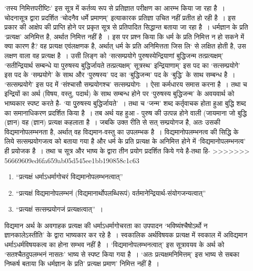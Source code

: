 ‘तस्य निमित्तपरीष्टिः' इस सूत्र में कर्तव्य रूप से प्रतिज्ञात परीक्षण का आरम्भ किया जा रहा है~। चोदनासूत्र द्वारा प्रदर्शित ‘चोदनैव धर्मे प्रमाणम्' इत्याकारक प्रतिज्ञा उचित नहीं प्रतीत हो रही है~। इस प्रकार की आक्षेप की प्राप्ति होने पर प्रकृत सूत्र से प्रतिपादित सिद्धान्त बताया जा रहा है~। धर्मज्ञान के प्रति ‘प्रत्यक्ष' अनिमित्त है, अर्थात निमित्त नहीं है~। इस पर प्रश्न किया कि धर्म के प्रति निमित्त न हो सकने में क्या कारण है? वह प्रत्यक्ष एवंलक्षणक है, अर्थात् धर्म के प्रति अनिमित्तता जिस लि‘ से लक्षित होती है, उस लक्षण वाला वह प्रत्यक्ष है~। उसी लिङ्ग को ‘सत्सम्प्रयोगे पुरुषस्येन्द्रियाणां बुद्धिजन्म तत्प्रत्यक्षम्' ‘सतीन्द्रियार्थ सम्बन्धे या पुरुषस्य बुद्धिर्जायते तत्प्रत्यक्षम्' सूत्रस्थ' इन्द्रियाणाम्' इस पद का ‘सत्सम्प्रयोगे' इस पद के ‘सम्प्रयोगे' के साथ और ‘पुरुषस्य' पद का ‘बुद्धिजन्म' पद के ‘बुद्धि' के साथ सम्बन्ध है~। ‘सत्सम्प्रयोगे' इस पद में ‘संश्चासौ सम्प्रयोगश्च' सत्सम्प्रयोगः~। ऐसा कर्मधारय समास करना है~। तथा च इन्द्रियों का अर्थ (विषय, वस्तु, पदार्थ) के साथ सम्बन्ध होने पर ‘पुरुषस्य बुद्धिजन्म' के अवयवार्थ को भाष्यकार स्पष्ट करते है- ‘या पुुरुषस्य बुद्धिर्जायते'~। तथा च ‘जन्म' शब्द कर्तृवाचक होता हुआ बुद्धि शब्द का समानाधिकरण प्रदर्शित किया है~। तब अर्थ यह हुआ - पुरुष की उत्पन्न होने वाली (जायमाना जो बुद्धि (ज्ञान) वह (ज्ञान) प्रत्यक्ष कहलाता है~। जबकि उक्त रीति से सत् सम्प्रयोगज है, अतः उसकी विद्यमानोपलम्भनता है, अर्थात् वह विद्यमान-वस्तु का उपलम्भक है~। विद्यमानोपलम्भनत्व की सिद्धि के लिये सत्सम्प्रयोगजत्व को बताया गया है और धर्म के प्रति प्रत्यक्ष के अनिमित्त होने में ‘विद्यमानोपलम्भनत्व' ही प्रयोजक है~। तथा च सूत्र और भाष्य के द्वारा तीन प्रयोग प्रदर्शित किये गये है-तथा हि-
>>>>>>> 56669609ed6fa659ab05d545ee1bb190858c1c63

\begin{enumerate}
\item “प्रत्यक्षं धर्माऽधर्मागोचरं विद्यमानोपलम्भनत्वात्”

 \item “प्रत्यक्षं विद्यमानोपलम्भनं (विद्यमानार्थोपलब्धिरूपं) वर्तमानेन्द्रियार्थ-संयोगजन्यत्वात्”

 \item “प्रत्यक्षं सत्सम्प्रयोगजं प्रत्यक्षत्वात्”~।

\end{enumerate}

विद्यमान अर्थ के अवगाहक प्रत्यक्ष की धर्माऽधर्मागोचरता का उपपादन ‘भविष्यंश्चैषोऽर्थो न ज्ञानकालेऽस्तीति' के द्वारा भाष्यकार कर रहे है~। स्वकालिक अर्थविषयक प्रत्यक्ष में स्वकाल में अविद्यमान धर्माऽधर्मविषयकत्व का होना सम्भव नहीं है~। ‘विद्यमानोपलम्भनत्वात्' इस सूत्रावयव के अर्थ को ‘सतश्चैतदुपलम्भनं नासतः' भाष्य से स्पष्ट किया गया है~। ‘अतः प्रत्यक्षमनिमित्तम्' इस भाष्य से सबका निष्कर्ष बताया कि धर्मज्ञान के प्रति' प्रत्यक्ष प्रमाण' निमित्त नहीं है~।

